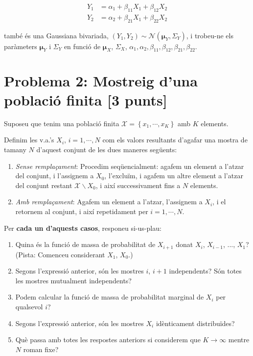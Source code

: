 \documentclass[10pt,a4paper]{article}
\begin{document}
\begin{eqnarray}
Y_1 &= \alpha_1 + \beta_{11} X_1 + \beta_{12} X_2 \\
Y_2 &= \alpha_2 + \beta_{21} X_1 + \beta_{22} X_2 
\end{eqnarray}

també és una Gaussiana bivariada, $(Y_1, Y_2) \sim \mathcal{N}(\mathbf{\mu}_Y, \Sigma_Y)$, i trobeu-ne els paràmeters $\mathbf{\mu}_Y$ i $\Sigma_Y$ en funció de 
$\mathbf{\mu}_X$, $\Sigma_X$, $\alpha_1, \alpha_2, \beta_{11}, \beta_{12}, \beta_{21}, \beta_{22}$.


\section{Problema 2: Mostreig d'una població finita [3 punts]}

Suposeu que tenim una població finita $\mathcal{X}=\left\{x_1, \cdots, x_K\right\}$ amb $K$ elements.

Definim les v.a.'s $X_i$, $i=1, \cdots, N$ com els valors resultants d'agafar una mostra de tamany $N$ d'aquest conjunt de les dues maneres següents:

\begin{enumerate}
\item \emph{Sense remplaçament}: Procedim seqüencialment: agafem un element a l'atzar del conjunt, i l'assignem a $X_0$, l'excluïm, i agafem un altre element a l'atzar del conjunt restant $\mathcal{X} \backslash X_0$, i així successivament fins a $N$ elements.
\item \emph{Amb remplaçament}: Agafem un element a l'atzar, l'assignem a $X_i$, i el retornem al conjunt, i així repetidament per $i=1, \cdots, N$.
\end{enumerate}

Per \textbf{cada un d'aquests casos}, responeu si-us-plau:

\begin{enumerate}
\item Quina és la funció de massa de probabilitat de $X_{i+1}$ donat $X_i$, $X_{i-1}$, ..., $X_1$? (Pista: Comenceu considerant $X_1$, $X_0$.)
\item Segons l'expressió anterior, són les mostres $i$, $i+1$ independents? Són totes les mostres mutualment independents?
\item Podem calcular la funció de massa de probabilitat marginal de $X_i$ per qualsevol $i$? 
\item Segons l'expressió anterior, són les mostres $X_i$ idènticament distribuïdes?
\item Què passa amb totes les respostes anteriors si considerem que $K \to \infty$ mentre $N$ roman fixe?
\end{enumerate}
\end{document}
